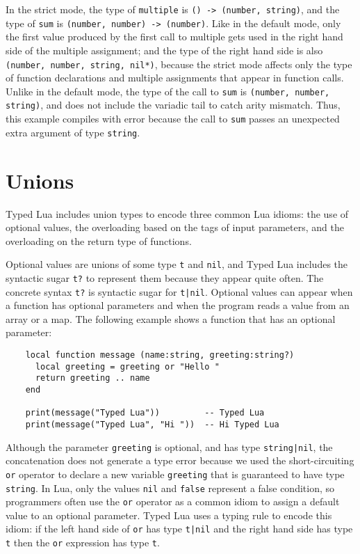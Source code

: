 In the strict mode, the type of \texttt{multiple} is \texttt{() -> (number, string)},
and the type of \texttt{sum} is \texttt{(number, number) -> (number)}.
Like in the default mode, only the first value produced by the
first call to multiple gets used in the right hand side of the
multiple assignment;
and the type of the right hand side is also
\texttt{(number, number, string, nil*)},
because the strict mode affects only the type of function declarations
and multiple assignments that appear in function calls.
Unlike in the default mode, the type of the call to \texttt{sum} is
\texttt{(number, number, string)}, and does not include the
variadic tail to catch arity mismatch.
Thus, this example compiles with error because the call to \texttt{sum}
passes an unexpected extra argument of type \texttt{string}.

\section{Unions}

Typed Lua includes union types to encode three common Lua idioms:
the use of optional values, the overloading based on the tags of
input parameters, and the overloading on the return type of functions.

Optional values are unions of some type \texttt{t} and \texttt{nil},
and Typed Lua includes the syntactic sugar \texttt{t?} to represent
them because they appear quite often.
The concrete syntax \texttt{t?} is syntactic sugar for \texttt{t|nil}.
Optional values can appear when a function has optional parameters
and when the program reads a value from an array or a map.
The following example shows a function that has an optional parameter:
\begin{verbatim}
    local function message (name:string, greeting:string?)
      local greeting = greeting or "Hello "
      return greeting .. name
    end

    print(message("Typed Lua"))         -- Typed Lua
    print(message("Typed Lua", "Hi "))  -- Hi Typed Lua
\end{verbatim}

Although the parameter \texttt{greeting} is optional, and has type
\texttt{string|nil}, the concatenation does not generate a type error
because we used the short-circuiting \texttt{or} operator to declare a
new variable \texttt{greeting} that is guaranteed to have type \texttt{string}. 
In Lua, only the values \texttt{nil} and \texttt{false} represent a
false condition, so programmers often use the \texttt{or} operator as a
common idiom to assign a default value to an optional parameter. 
Typed Lua uses a typing rule to encode this idiom: 
if the left hand side of \texttt{or} has type \texttt{t|nil} and
the right hand side has type \texttt{t} then the \texttt{or} expression has
type \texttt{t}.

